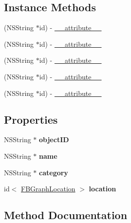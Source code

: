 \subsection*{Instance Methods}
\begin{DoxyCompactItemize}
\item 
(N\+S\+String $\ast$id) -\/ \hyperlink{protocolFBGraphPlace-p_a94e6e9afc56a6bc4969632f665758ff8}{\+\_\+\+\_\+attribute\+\_\+\+\_\+}
\item 
(N\+S\+String $\ast$id) -\/ \hyperlink{protocolFBGraphPlace-p_a94e6e9afc56a6bc4969632f665758ff8}{\+\_\+\+\_\+attribute\+\_\+\+\_\+}
\item 
(N\+S\+String $\ast$id) -\/ \hyperlink{protocolFBGraphPlace-p_a94e6e9afc56a6bc4969632f665758ff8}{\+\_\+\+\_\+attribute\+\_\+\+\_\+}
\item 
(N\+S\+String $\ast$id) -\/ \hyperlink{protocolFBGraphPlace-p_a94e6e9afc56a6bc4969632f665758ff8}{\+\_\+\+\_\+attribute\+\_\+\+\_\+}
\item 
(N\+S\+String $\ast$id) -\/ \hyperlink{protocolFBGraphPlace-p_a94e6e9afc56a6bc4969632f665758ff8}{\+\_\+\+\_\+attribute\+\_\+\+\_\+}
\end{DoxyCompactItemize}
\subsection*{Properties}
\begin{DoxyCompactItemize}
\item 
\mbox{\label{protocolFBGraphPlace-p_a7e4b4d9ba57d59c3f5fd75f231ff5789}} 
N\+S\+String $\ast$ {\bfseries object\+ID}
\item 
\mbox{\label{protocolFBGraphPlace-p_a63ec39952783e54d8e1c308d62fd12e6}} 
N\+S\+String $\ast$ {\bfseries name}
\item 
\mbox{\label{protocolFBGraphPlace-p_a0d805562207cafe7acb117e0e808e0a2}} 
N\+S\+String $\ast$ {\bfseries category}
\item 
\mbox{\label{protocolFBGraphPlace-p_ac886a546d3eac57bee5ff0afd0af6a91}} 
id$<$ \hyperlink{protocolFBGraphLocation-p}{F\+B\+Graph\+Location} $>$ {\bfseries location}
\end{DoxyCompactItemize}


\subsection{Method Documentation}
\mbox{\label{protocolFBGraphPlace-p_a94e6e9afc56a6bc4969632f665758ff8}} 
